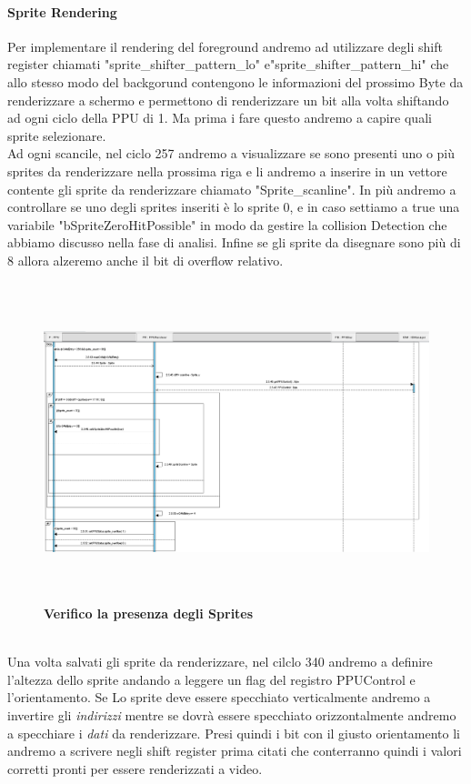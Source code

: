 \documentclass[11pt]{article}
\begin{document}
\paragraph{Sprite Rendering}
Per implementare il rendering del foreground andremo ad utilizzare degli shift register chiamati "sprite\_shifter\_pattern\_lo" e"sprite\_shifter\_pattern\_hi" che allo stesso modo del backgorund contengono le informazioni del prossimo Byte da renderizzare a schermo e permettono di renderizzare un bit alla volta shiftando ad ogni ciclo della PPU di 1. Ma prima i fare questo andremo a capire quali sprite selezionare. \\
Ad ogni scancile, nel ciclo 257 andremo a visualizzare se sono presenti uno o più sprites da renderizzare nella prossima riga e li andremo a inserire in un vettore contente gli sprite da renderizzare chiamato "Sprite\_scanline". In più andremo a controllare se uno degli sprites inseriti è lo sprite 0, e in caso settiamo a true una variabile "bSpriteZeroHitPossible" in modo da gestire la collision Detection che abbiamo discusso nella fase di analisi. Infine se gli sprite da disegnare sono più di 8 allora alzeremo anche il bit di overflow relativo. 
\begin{figure}[h]
\hspace*{-4.2cm}
\centering
\includegraphics[width=600px, height=350px]{Verifica_Sprites.png}\\
\small\textbf{Verifico la presenza degli Sprites}
\end{figure}\\
Una volta salvati gli sprite da renderizzare, nel cilclo 340 andremo a definire l'altezza dello sprite andando a leggere un flag del registro PPUControl e l'orientamento. Se Lo sprite deve essere specchiato verticalmente andremo a invertire gli \emph{indirizzi} mentre se dovrà essere specchiato orizzontalmente andremo a specchiare i \emph{dati} da renderizzare. Presi quindi i bit con il giusto orientamento li andremo a scrivere negli shift register prima citati che conterranno quindi i valori corretti pronti per essere renderizzati a video. \\
\end{document}
